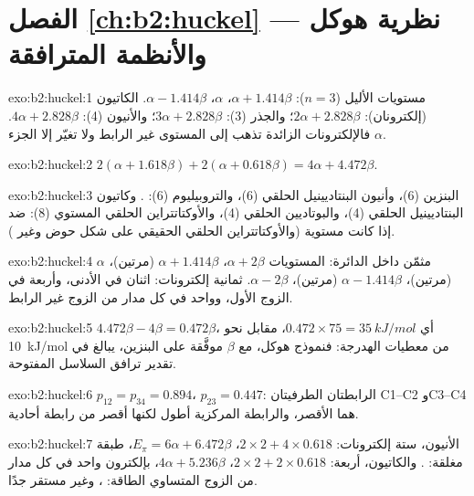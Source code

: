 \section*{الفصل \ref{ch:b2:huckel} --- نظرية هوكل والأنظمة المترافقة}

\begin{solution}{exo:b2:huckel:1}
مستويات الأليل ($n = 3$): $\alpha + 1.414\beta$، $\alpha$، $\alpha - 1.414\beta$. الكاتيون (إلكترونان):
$2\alpha + 2.828\beta$؛ والجذر (3): $3\alpha + 2.828\beta$؛ والأنيون (4): $4\alpha + 2.828\beta$. فالإلكترونات
الزائدة تذهب إلى المستوى غير الرابط ولا تغيّر إلا الجزء $\alpha$.
\end{solution}

\begin{solution}{exo:b2:huckel:2}
$2(\alpha + 1.618\beta) + 2(\alpha + 0.618\beta) = 4\alpha + 4.472\beta$.
\end{solution}

\begin{solution}{exo:b2:huckel:3}
البنزين (6)، وأنيون البنتاديينيل الحلقي (6)، والتروبيليوم (6): . وكاتيون البنتاديينيل
الحلقي (4)، والبوتاديين الحلقي (4)، والأوكتاتتراين الحلقي المستوي (8): ضد  إذا كانت مستوية
(والأوكتاتتراين الحلقي الحقيقي على شكل حوض وغير ).
\end{solution}

\begin{solution}{exo:b2:huckel:4}
مثمّن داخل الدائرة: المستويات $\alpha + 2\beta$، $\alpha + 1.414\beta$ (مرتين)، $\alpha$ (مرتين)،
$\alpha - 1.414\beta$ (مرتين)، $\alpha - 2\beta$. ثمانية إلكترونات: اثنان في الأدنى، وأربعة في
الزوج الأول، وواحد في كل مدار من الزوج غير الرابط.
\end{solution}

\begin{solution}{exo:b2:huckel:5}
$4.472\beta - 4\beta = 0.472\beta$، أي $0.472 \times 75 = \qty{35}{kJ/mol}$، مقابل نحو
\qty{10}{kJ/mol} من معطيات الهدرجة: فنموذج هوكل، مع $\beta$ موفَّقة على البنزين،
يبالغ في تقدير ترافق السلاسل المفتوحة.
\end{solution}

\begin{solution}{exo:b2:huckel:6}
$p_{12} = p_{34} = 0.894$، $p_{23} = 0.447$: الرابطتان الطرفيتان C1--C2 وC3--C4 هما
الأقصر، والرابطة المركزية أطول لكنها أقصر من رابطة أحادية.
\end{solution}

\begin{solution}{exo:b2:huckel:7}
الأنيون، ستة إلكترونات: $2 \times 2 + 4 \times 0.618$، $E_\pi = 6\alpha + 6.472\beta$، طبقة مغلقة:
. والكاتيون، أربعة: $2 \times 2 + 2 \times 0.618$، $4\alpha + 5.236\beta$، بإلكترون واحد
في كل مدار من الزوج المتساوي الطاقة: ، وغير مستقر جدًا.
\end{solution}

